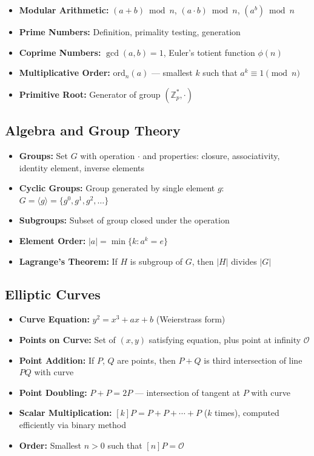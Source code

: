 \documentclass[11pt,a4paper,oneside]{book}
\begin{document}
\begin{itemize}
  \item \textbf{Modular Arithmetic:} $(a + b) \bmod n$, $(a \cdot b) \bmod n$, $(a^b) \bmod n$
  \item \textbf{Prime Numbers:} Definition, primality testing, generation
  \item \textbf{Coprime Numbers:} $\gcd(a, b) = 1$, Euler's totient function $\phi(n)$
  \item \textbf{Multiplicative Order:} $\text{ord}_n(a)$ — smallest $k$ such that $a^k \equiv 1 \pmod{n}$
  \item \textbf{Primitive Root:} Generator of group $(\mathbb{Z}_p^*, \cdot)$
\end{itemize}
\vspace{-0.2cm}\subsection{Algebra and Group Theory}
\begin{itemize}
  \item \textbf{Groups:} Set $G$ with operation $\cdot$ and properties: closure, associativity, identity element, inverse elements
  \item \textbf{Cyclic Groups:} Group generated by single element $g$: $G = \langle g \rangle = \{g^0, g^1, g^2, \ldots\}$
  \item \textbf{Subgroups:} Subset of group closed under the operation
  \item \textbf{Element Order:} $|a| = \min\{k : a^k = e\}$
  \item \textbf{Lagrange's Theorem:} If $H$ is subgroup of $G$, then $|H|$ divides $|G|$
\end{itemize}
\vspace{-0.2cm}\subsection{Elliptic Curves}
\begin{itemize}
  \item \textbf{Curve Equation:} $y^2 = x^3 + ax + b$ (Weierstrass form)
  \item \textbf{Points on Curve:} Set of $(x, y)$ satisfying equation, plus point at infinity $\mathcal{O}$
  \item \textbf{Point Addition:} If $P$, $Q$ are points, then $P + Q$ is third intersection of line $PQ$ with curve
  \item \textbf{Point Doubling:} $P + P = 2P$ — intersection of tangent at $P$ with curve
  \item \textbf{Scalar Multiplication:} $[k]P = P + P + \cdots + P$ ($k$ times), computed efficiently via binary method
  \item \textbf{Order:} Smallest $n > 0$ such that $[n]P = \mathcal{O}$
\end{itemize}
\end{document}
